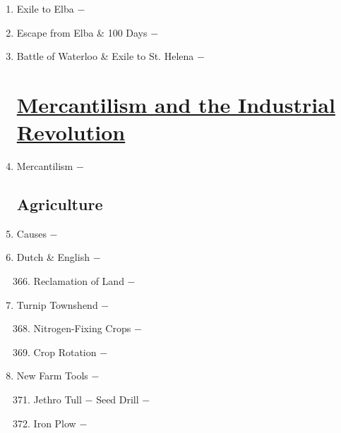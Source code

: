\documentclass[12pt]{article}
\begin{document}
\begin{enumerate}
\item Exile to Elba $-$ 

\item Escape from Elba \& 100 Days $-$ 

\item Battle of Waterloo \& Exile to St. Helena $-$ 

\section[\underline{Mercantilism, Agricultural Revolution, \& Industrial Revolution}]{\underline{Mercantilism and the Industrial Revolution}}

\item Mercantilism $-$ 

\subsection{Agriculture}

\item Causes $-$ 

\item Dutch \& English $-$ 
 
\begin{enumerate}[label=\arabic{*}.]
\setcounter{enumii}{365}

\item Reclamation of Land $-$

\end{enumerate}
\setcounter{enumi}{366}

\item Turnip Townshend $-$ 

\begin{enumerate}[label=\arabic{*}.]
\setcounter{enumii}{367}

\item Nitrogen-Fixing Crops $-$

\item Crop Rotation $-$

\end{enumerate}
\setcounter{enumi}{369}

\item New Farm Tools $-$ 

\begin{enumerate}[label=\arabic{*}.]
\setcounter{enumii}{370}

\item Jethro Tull $-$ Seed Drill $-$

\item Iron Plow $-$ 


\end{enumerate}
\end{enumerate}
\end{document}
